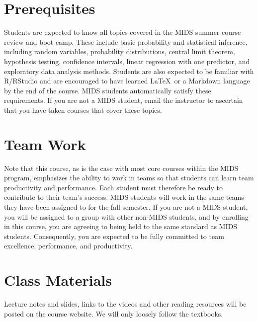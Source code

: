 \documentclass[11pt, a4paper]{article}
\begin{document}
\section{Prerequisites}
Students are expected to know all topics covered in the MIDS summer course review and boot camp. These include basic probability and statistical inference, including random variables, probability distributions, central limit theorem, hypothesis testing, confidence intervals, linear regression with one predictor, and exploratory data analysis methods. Students are also expected to be familiar with \textsf{R}/\textsf{RStudio} and are encouraged to have learned \LaTeX \ or a Markdown language by the end of the course. MIDS students automatically satisfy these requirements. If you are not a MIDS student, email the instructor to ascertain that you have taken courses that cover these topics.


\section{Team Work}
Note that this course, as is the case with most core courses within the MIDS program, emphasizes the ability to work in teams so that students can learn team productivity and performance. Each student must therefore be ready to contribute to their team's success. MIDS students will work in the same teams they have been assigned to for the fall semester. If you are not a MIDS student, you will be assigned to a group with other non-MIDS students, and by enrolling in this course, you are agreeing to being held to the same standard as MIDS students. Consequently,  you are expected to be fully committed to team excellence, performance, and productivity.


\section{Class Materials}
Lecture notes and slides, links to the videos and other reading resources will be posted on the course website. We will only loosely follow the textbooks.
\end{document}
